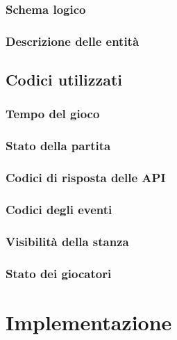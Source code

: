 \documentclass[10pt,twoside,cucitura]{toptesi}
\begin{document}
\subsection{Schema logico}


\subsection{Descrizione delle entità}


\section{Codici utilizzati}


\subsection{Tempo del gioco}
\label{sec:tempo}


\subsection{Stato della partita}
\label{sec:statoPartita}


\subsection{Codici di risposta delle API}


\subsection{Codici degli eventi}
\label{sec:codiciEventi}


\subsection{Visibilità della stanza}
\label{sec:visibilita}


\subsection{Stato dei giocatori}
\label{sec:statoGiocatore}


\chapter{Implementazione}
\end{document}
